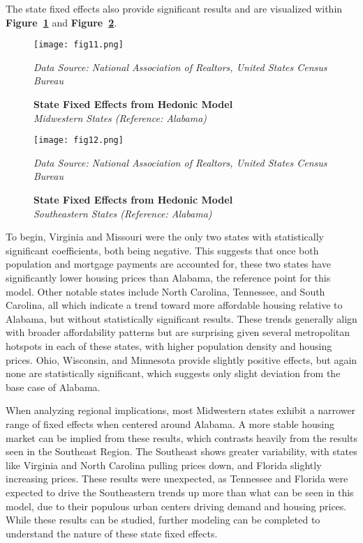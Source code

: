\documentclass[journal,article,submit,pdftex,moreauthors]{Definitions/mdpi}
\begin{document}
The state fixed effects also provide significant results and are visualized within \textbf{Figure~\ref{fig:figure11}} and \textbf{Figure~\ref{fig:figure12}}. 

\begin{figure}[H]
  \centering
  \texttt{[image: fig11.png]}
  \caption{\textbf{State Fixed Effects from Hedonic Model}\\\textit{Midwestern States (Reference: Alabama)}}
  \label{fig:figure11}
  \vspace{1ex}
  {\footnotesize\textit{Data Source: National Association of Realtors, United States Census Bureau}}
\end{figure}

\begin{figure}[H]
  \centering
  \texttt{[image: fig12.png]}
  \caption{\textbf{State Fixed Effects from Hedonic Model}\\\textit{Southeastern States (Reference: Alabama)}}
  \label{fig:figure12}
  \vspace{1ex}
  {\footnotesize\textit{Data Source: National Association of Realtors, United States Census Bureau}}
\end{figure}

To begin, Virginia and Missouri were the only two states with statistically significant coefficients, both being negative. This suggests that once both population and mortgage payments are accounted for, these two states have significantly lower housing prices than Alabama, the reference point for this model. Other notable states include North Carolina, Tennessee, and South Carolina, all which indicate a trend toward more affordable housing relative to Alabama, but without statistically significant results. These trends generally align with broader affordability patterns but are surprising given several metropolitan hotspots in each of these states, with higher population density and housing prices.  Ohio, Wisconsin, and Minnesota provide slightly positive effects, but again none are statistically significant, which suggests only slight deviation from the base case of Alabama.

When analyzing regional implications, most Midwestern states exhibit a narrower range of fixed effects when centered around Alabama. A more stable housing market can be implied from these results, which contrasts heavily from the results seen in the Southeast Region. The Southeast shows greater variability, with states like Virginia and North Carolina pulling prices down, and Florida slightly increasing prices. These results were unexpected, as Tennessee and Florida were expected to drive the Southeastern trends up more than what can be seen in this model, due to their populous urban centers driving demand and housing prices. While these results can be studied, further modeling can be completed to understand the nature of these state fixed effects.  
 
\end{document}
